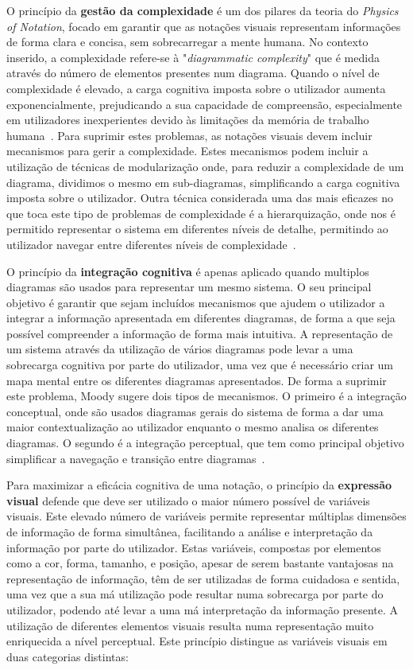 O princípio da \textbf{gestão da complexidade} é um dos pilares da teoria do \textit{Physics of Notation}, focado em garantir que as notações visuais representam informações de forma clara e concisa, sem sobrecarregar a mente humana. No contexto inserido, a complexidade refere-se à "\textit{diagrammatic complexity}" que é medida através do número de elementos presentes num diagrama. Quando o nível de complexidade é elevado, a carga cognitiva imposta sobre o utilizador aumenta exponencialmente, prejudicando a sua capacidade de compreensão, especialmente em utilizadores inexperientes devido às limitações da memória de trabalho humana~\cite{sweller1988cognitive}. Para suprimir estes problemas, as notações visuais devem incluir mecanismos para gerir a complexidade. Estes mecanismos podem incluir a utilização de técnicas de modularização onde, para reduzir a complexidade de um diagrama, dividimos o mesmo em sub-diagramas, simplificando a carga cognitiva imposta sobre o utilizador. Outra técnica considerada uma das mais eficazes no que toca este tipo de problemas de complexidade é a hierarquização, onde nos é permitido representar o sistema em diferentes níveis de detalhe, permitindo ao utilizador navegar entre diferentes níveis de complexidade~\cite{moody2009physics}. 

O princípio da \textbf{integração cognitiva} é apenas aplicado quando multiplos diagramas são usados para representar um mesmo sistema. O seu principal objetivo é garantir que sejam incluídos mecanismos que ajudem o utilizador a integrar a informação apresentada em diferentes diagramas, de forma a que seja possível compreender a informação de forma mais intuitiva. A representação de um sistema através da utilização de vários diagramas pode levar a uma sobrecarga cognitiva por parte do utilizador, uma vez que é necessário criar um mapa mental entre os diferentes diagramas apresentados. De forma a suprimir este problema, Moody sugere dois tipos de mecanismos. O primeiro é a integração conceptual, onde são usados diagramas gerais do sistema de forma a dar uma maior contextualização ao utilizador enquanto o mesmo analisa os diferentes diagramas. O segundo é a integração perceptual, que tem como principal objetivo simplificar a navegação e transição entre diagramas~\cite{moody2009physics}.

Para maximizar a eficácia cognitiva de uma notação, o princípio da \textbf{expressão visual} defende que deve ser utilizado o maior número possível de variáveis visuais. Este elevado número de variáveis permite representar múltiplas dimensões de informação de forma simultânea, facilitando a análise e interpretação da informação por parte do utilizador. Estas variáveis, compostas por elementos como a cor, forma, tamanho, e posição, apesar de serem bastante vantajosas na representação de informação, têm de ser utilizadas de forma cuidadosa e sentida, uma vez que a sua má utilização pode resultar numa sobrecarga por parte do utilizador, podendo até levar a uma má interpretação da informação presente. A utilização de diferentes elementos visuais resulta numa representação muito enriquecida a nível perceptual. Este princípio distingue as variáveis visuais em duas categorias distintas:

